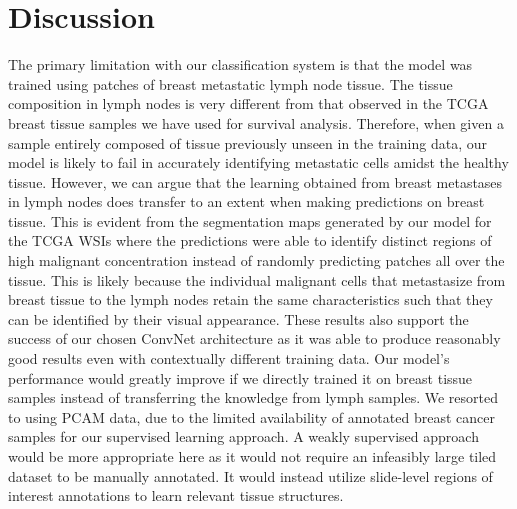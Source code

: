 \documentclass{l4proj}
\begin{document}
\section{Discussion}
The primary limitation with our classification system is that the model was trained using patches of breast metastatic lymph node tissue. The tissue composition in lymph nodes is very different from that observed in the TCGA breast tissue samples we have used for survival analysis. Therefore, when given a sample entirely composed of tissue previously unseen in the training data, our model is likely to fail in accurately identifying metastatic cells amidst the healthy tissue. However, we can argue that the learning obtained from breast metastases in lymph nodes does transfer to an extent when making predictions on breast tissue. This is evident from the segmentation maps generated by our model for the TCGA WSIs where the predictions were able to identify distinct regions of high malignant concentration instead of randomly predicting patches all over the tissue. This is likely because the individual malignant cells that metastasize from breast tissue to the lymph nodes retain the same characteristics such that they can be identified by their visual appearance. These results also support the success of our chosen ConvNet architecture as it was able to produce reasonably good results even with contextually different training data. Our model's performance would greatly improve if we directly trained it on breast tissue samples instead of transferring the knowledge from lymph samples. We resorted to using PCAM data, due to the limited availability of annotated breast cancer samples for our supervised learning approach. A weakly supervised approach would be more appropriate here as it would not require an infeasibly large tiled dataset to be manually annotated. It would instead utilize slide-level regions of interest annotations to learn relevant tissue structures. 
\end{document}
